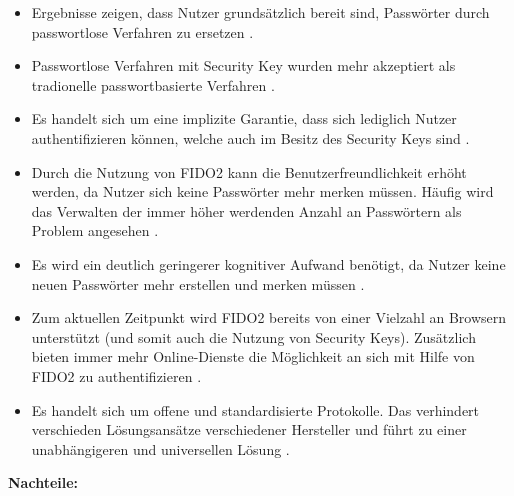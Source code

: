 \begin{itemize}
    \item Ergebnisse zeigen, dass Nutzer grundsätzlich bereit sind, Passwörter durch passwortlose Verfahren zu ersetzen \cite{lyastani2020fido2}.
    \item Passwortlose Verfahren mit Security Key wurden mehr akzeptiert als tradionelle passwortbasierte Verfahren \cite{lyastani2020fido2}.
    \item Es handelt sich um eine implizite Garantie, dass sich lediglich Nutzer authentifizieren können, welche auch im Besitz des Security Keys sind \cite{lyastani2020fido2}.
    \item Durch die Nutzung von FIDO2 kann die Benutzerfreundlichkeit erhöht werden, da Nutzer sich keine Passwörter mehr merken müssen. Häufig wird das Verwalten der immer höher werdenden Anzahl an Passwörtern als Problem angesehen \cite{lyastani2020fido2} \cite{farke2020you}.
    \item Es wird ein deutlich geringerer kognitiver Aufwand benötigt, da Nutzer keine neuen Passwörter mehr erstellen und merken müssen \cite{lyastani2020fido2}.
    \item Zum aktuellen Zeitpunkt wird FIDO2 bereits von einer Vielzahl an Browsern unterstützt (und somit auch die Nutzung von Security Keys). Zusätzlich bieten immer mehr Online-Dienste die Möglichkeit an sich mit Hilfe von FIDO2 zu authentifizieren \cite{lyastani2020fido2} \cite{farke2020you}.
    \item Es handelt sich um offene und standardisierte Protokolle. Das verhindert verschieden Lösungsansätze verschiedener Hersteller und führt zu einer unabhängigeren und universellen Lösung \cite{farke2020you}.
\end{itemize}

\textbf{Nachteile:}

